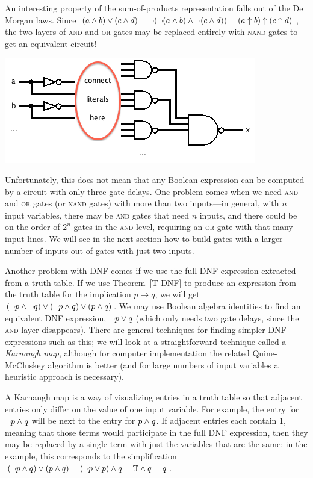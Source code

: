 An interesting property of the sum-of-products representation falls out of the De Morgan laws. Since $(a\wedge b)\vee(c\wedge d)=\lnot(\lnot(a\wedge b)\wedge\lnot(c\wedge d))=(a\uparrow b)\uparrow(c\uparrow d)$, the two layers of \textsc{and} and \textsc{or} gates may be replaced entirely with \textsc{nand} gates to get an equivalent circuit!
\begin{center}
\includegraphics[width=!,height=!,scale=0.75]{graphics/DNFlayersNand.png}
\end{center}

Unfortunately, this does not mean that any Boolean expression can be computed by a circuit with only three gate delays. One problem comes when we need \textsc{and} and \textsc{or} gates (or \textsc{nand} gates) with more than two inputs---in general, with $n$ input variables, there may be \textsc{and} gates that need $n$ inputs, and there could be on the order of $2^n$ gates in the \textsc{and} level, requiring an \textsc{or} gate with that many input lines. We will see in the next section how to build gates with a larger number of inputs out of gates with just two inputs.

Another problem with DNF comes if we use the full DNF expression extracted from a truth table.
If we use Theorem~\ref{T-DNF} to produce an expression from the truth table for the implication $p\rightarrow q$, we will get $(\lnot p\wedge\lnot q)\vee(\lnot p\wedge q)\vee(p\wedge q)$. We may use Boolean algebra identities to find an equivalent DNF expression, $\lnot p\vee q$ (which only needs two gate delays, since the \textsc{and} layer disappears). There are general techniques for finding simpler DNF expressions such as this; we will look at a straightforward technique called a \textit{Karnaugh map}, although for computer implementation the related Quine-McCluskey algorithm is better (and for large numbers of input variables a heuristic approach is necessary).

A Karnaugh map is a way of visualizing entries in a truth table so that adjacent entries only differ on the value of one input variable. For example, the entry for $\lnot p\wedge q$ will be next to the entry for $p\wedge q$. If adjacent entries each contain 1, meaning that those terms would participate in the full DNF expression, then they may be replaced by a single term with just the variables that are the same: in the example, this corresponds to the simplification $(\lnot p\wedge q)\vee(p\wedge q)=(\lnot p\vee p)\wedge q=\mathbb{T}\wedge q=q$.

